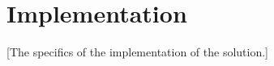 \section{Implementation}\label{Implementation}
    [The specifics of the implementation of the solution.]
